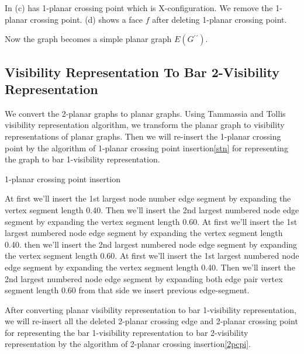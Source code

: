 In (c) has 1-planar crossing point which is X-configuration. We remove the 1-planar crossing point. (d) shows a face $f$ after deleting 1-planar crossing point.


Now the graph becomes a simple planar graph $E(G{^\prime}{^\prime})$. 



\subsection{Visibility Representation To Bar 2-Visibility Representation}
We convert the 2-planar graphs to planar graphs. Using Tammassia and Tollis \cite{R} visibility representation algorithm, we transform the planar graph to visibility representations of planar graphs. Then we will re-insert the 1-planar crossing point by the algorithm of 1-planar crossing point insertion\ref{stn} for representing the graph to bar 1-visibility representation.



\begin{algorithm}[H] 
\caption{1-planar crossing point insertion}
\label{1cpca}

\begin{algorithmic}[1]
{At first we'll insert the 1st largest node number edge segment  by expanding the vertex segment length 0.40. Then  we'll insert the 2nd largest numbered node edge segment  by expanding the vertex segment length 0.60.}
\ENDIF
{}
{At first we'll insert the 1st largest  numbered node edge segment  by expanding the vertex segment length 0.40.
then  we'll insert the 2nd largest numbered node edge segment  by expanding the vertex segment length 0.60.}
\ENDIF
{}
{ At first we'll insert the 1st largest numbered node edge segment  by expanding the vertex segment length 0.40. Then  we'll insert the 2nd largest numbered node edge segment  by expanding both edge pair vertex segment length 0.60 from that side we insert previous edge-segment.} \ENDIF
\end{algorithmic}
\end{algorithm}

After converting planar visibility representation to bar 1-visibility representation, we will re-insert all the deleted 2-planar crossing edge and 2-planar crossing point for representing the bar 1-visibility representation to bar 2-visibility representation by the algorithm of 2-planar crossing insertion\ref{2pcpi}. 



